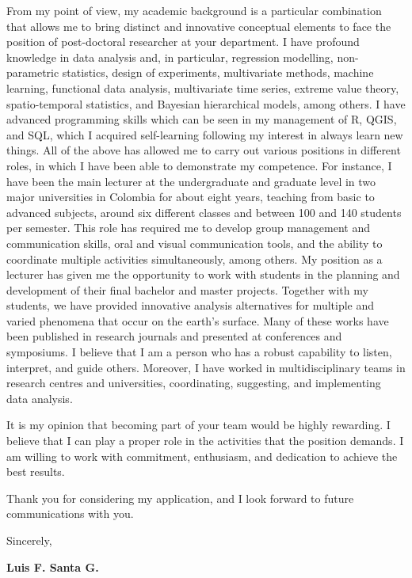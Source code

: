 \documentclass[11pt, a4paper]{awesome-cv}
\begin{document}
\begin{cvletter}
From my point of view, my academic background is a particular combination that allows me to bring distinct and innovative conceptual elements to face the position of post-doctoral researcher at your department. I have profound knowledge in data analysis and, in particular, regression modelling, non-parametric statistics, design of experiments, multivariate methods, machine learning, functional data analysis, multivariate time series, extreme value theory, spatio-temporal statistics, and Bayesian hierarchical models, among others. I have advanced programming skills which can be seen in my management of R, QGIS, and SQL, which I acquired self-learning following my interest in always learn new things. All of the above has allowed me to carry out various positions in different roles, in which I have been able to demonstrate my competence. For instance, I have been the main lecturer at the undergraduate and graduate level in two major universities in Colombia for about eight years, teaching from basic to advanced subjects, around six different classes and between 100 and 140 students per semester. This role has required me to develop group management and communication skills, oral and visual communication tools, and the ability to coordinate multiple activities simultaneously, among others. My position as a lecturer has given me the opportunity to work with students in the planning and development of their final bachelor and master projects. Together with my students, we have provided innovative analysis alternatives for multiple and varied phenomena that occur on the earth’s surface. Many of these works have been published in research journals and presented at conferences and symposiums. I believe that I am a person who has a robust capability to listen, interpret, and guide others. Moreover, I have worked in multidisciplinary teams in research centres and universities, coordinating, suggesting, and implementing data analysis.\par
It is my opinion that becoming part of your team would be highly rewarding. I believe that I can play a proper role in the activities that the position demands. I am willing to work with commitment, enthusiasm, and dedication to achieve the best results.\par
Thank you for considering my application, and I look forward to future communications with you.\par
Sincerely,\par
{\bf Luis F. Santa G.}
\end{cvletter}


\end{document}
